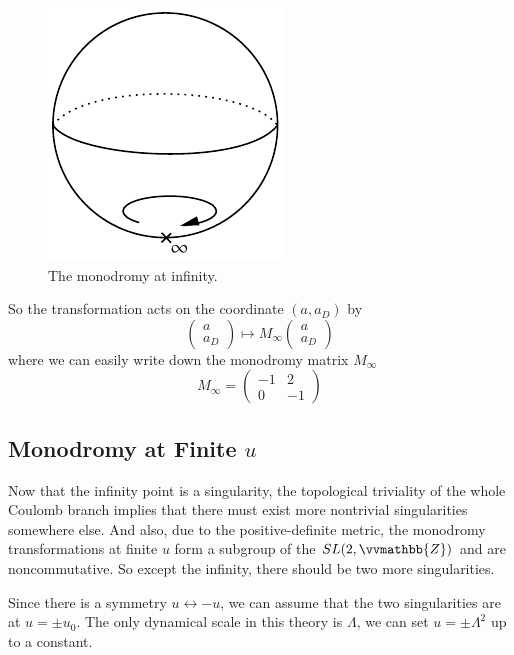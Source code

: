 \documentclass{article}
\begin{document}
\begin{figure}[htbp]
\centering
\includegraphics{infty.pdf}
\caption{The monodromy at infinity.}
\label{fig:descendent}
\end{figure}

So the transformation acts on the coordinate $(a,a_D)$ by
\begin{equation}
\left(\begin{array}{cc}
a\\
a_D
\end{array}\right)\mapsto M_\infty
\left(\begin{array}{cc}
a\\
a_D
\end{array}\right)
\end{equation}
where we can easily write down the monodromy matrix $M_\infty$
\begin{equation}
M_{\infty}=\left(\begin{array}{cc}
-1 & 2 \\
0 & -1
\end{array}\right)
\end{equation}

\subsection{Monodromy at Finite $u$}
Now that the infinity point is a singularity, the topological triviality of the whole Coulomb branch implies that there must exist more nontrivial singularities somewhere else. And also, due to the positive-definite metric, the monodromy transformations at finite $u$ form a subgroup of the $SL(2,\vvmathbb{Z})$ and are noncommutative. So except the infinity, there should be two more singularities. 

Since there is a symmetry $u\leftrightarrow -u$, we can assume that the two singularities are at $u= \pm u_0$. The only dynamical scale in this theory is $\Lambda$, we can set $u=\pm\Lambda^2$ up to a constant.
\end{document}
